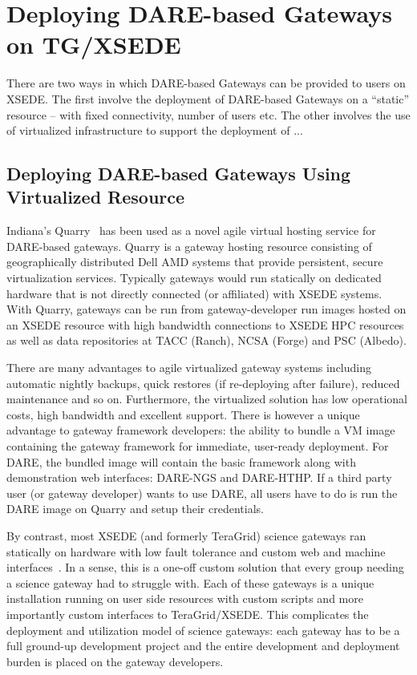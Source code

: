 \documentclass[]{svjour3}
\begin{document}
%

\section{Deploying DARE-based Gateways on TG/XSEDE}

There are two ways in which DARE-based Gateways can be provided to
users on XSEDE. The first involve the deployment of DARE-based
Gateways on a ``static'' resource -- with fixed connectivity, number
of users etc. The other involves the use of virtualized infrastructure
to support the deployment of ...

\subsection{Deploying DARE-based Gateways Using Virtualized Resource}
Indiana's Quarry~\cite{quarry} has been used as a novel agile virtual hosting
service for DARE-based gateways. Quarry is a gateway hosting resource
consisting of
geographically distributed Dell AMD systems that provide persistent,
secure virtualization services. Typically gateways would run
statically on dedicated hardware that is not directly connected (or
affiliated) with XSEDE systems. With Quarry, gateways can be run from
gateway-developer run images hosted on an XSEDE resource with high
bandwidth connections to XSEDE HPC resources as well as data
repositories at TACC (Ranch), NCSA (Forge) and PSC (Albedo).

There are many advantages to agile virtualized gateway systems
including automatic nightly backups, quick restores (if re-deploying
after failure), reduced maintenance and so on. Furthermore, the
virtualized solution has low operational costs, high bandwidth and
excellent support. There is however a unique advantage to gateway
framework developers: the ability to bundle a VM image containing the
gateway framework for immediate, user-ready deployment. For DARE, the
bundled image will contain the basic framework along with
demonstration web interfaces: DARE-NGS and DARE-HTHP. If a third party
user (or gateway developer) wants to use DARE, all users have to do is
run the DARE image on Quarry and setup their credentials.

By contrast, most XSEDE (and formerly TeraGrid) science gateways ran
statically on hardware with low fault tolerance and custom web and
machine interfaces~\cite{xsedegateways}. In a
sense, this is a one-off custom solution that every group needing a
science gateway had to struggle with. Each of these gateways is a
unique installation running on user side resources with custom scripts
and more importantly custom interfaces to TeraGrid/XSEDE. This
complicates the deployment and utilization model of science gateways:
each gateway has to be a full ground-up development project and the
entire development and deployment burden is placed on the gateway
developers.
\end{document}
